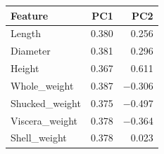\begin{tabular}{lrr}
\toprule
Feature & PC1 & PC2 \\
\midrule
Length & 0.380 & 0.256 \\
Diameter & 0.381 & 0.296 \\
Height & 0.367 & 0.611 \\
Whole\_weight & 0.387 & $-$0.306 \\
Shucked\_weight & 0.375 & $-$0.497 \\
Viscera\_weight & 0.378 & $-$0.364 \\
Shell\_weight & 0.378 & 0.023 \\
\bottomrule
\end{tabular}
